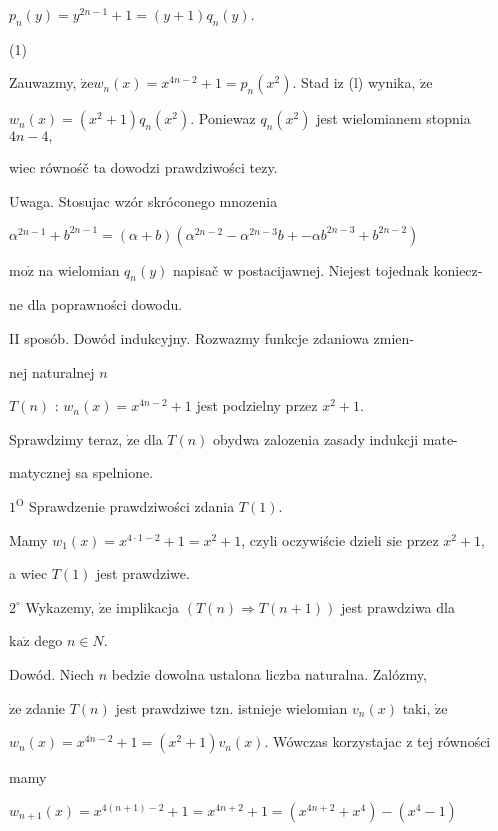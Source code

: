 \documentclass[a4paper,12pt]{article}
\begin{document}
$p_{n}(y)=y^{2n-1}+1=(y+1)q_{n}(y).$

(1)

Zauwazmy, $\dot{\mathrm{z}}\mathrm{e} w_{n}(x) = x^{4n-2}+1 =p_{n}(x^{2})$. Stad $\mathrm{i} \mathrm{z}$ (l) wynika, $\dot{\mathrm{z}}\mathrm{e}$

$w_{n}(x)=(x^{2}+1)q_{n}(x^{2})$. Poniewaz $q_{n}(x^{2})$ jest wielomianem stopnia $4n-4,$

wiec równośč ta dowodzi prawdziwości tezy.

Uwaga. Stosujac wzór skróconego mnozenia

$\alpha^{2n-1}+b^{2n-1}=(\alpha+b)(\alpha^{2n-2}-\alpha^{2n-3}b+-\alpha b^{2n-3}+b^{2n-2})$

$\mathrm{m}\mathrm{o}\dot{\mathrm{z}}$ na wielomian $q_{n}(y)$ napisač $\mathrm{w}$ postacijawnej. Niejest tojednak koniecz-

ne dla poprawności dowodu.

II sposób. Dowód indukcyjny. Rozwazmy funkcje zdaniowa zmien-

nej naturalnej $n$

$T(n)$ : $w_{n}(x)=x^{4n-2}+1$ jest podzielny przez $x^{2}+1.$

Sprawdzimy teraz, $\dot{\mathrm{z}}\mathrm{e}$ dla $T(n)$ obydwa zalozenia zasady indukcji mate-

matycznej sa spelnione.

$1^{\mathrm{O}}$ Sprawdzenie prawdziwości zdania $T(1).$

Mamy $w_{1}(x)=x^{4\cdot 1-2}+1=x^{2}+1$, czyli oczywiście dzieli $\mathrm{s}\mathrm{i}\mathrm{e}$ przez $x^{2}+1,$

a wiec $T(1)$ jest prawdziwe.

$2^{\circ}$ Wykazemy, $\dot{\mathrm{z}}\mathrm{e}$ implikacja $(T(n)\Rightarrow T(n+1))$ jest prawdziwa dla

$\mathrm{k}\mathrm{a}\dot{\mathrm{z}}$ dego $n\in N.$

Dowód. Niech $n$ bedzie dowolna ustalona liczba naturalna. Zalózmy,

$\dot{\mathrm{z}}\mathrm{e}$ zdanie $T(n)$ jest prawdziwe $\mathrm{t}\mathrm{z}\mathrm{n}$. istnieje wielomian $v_{n}(x)$ taki, $\dot{\mathrm{z}}\mathrm{e}$

$w_{n}(x) =x^{4n-2}+1 = (x^{2}+1)v_{n}(x)$. Wówczas korzystajac $\mathrm{z}$ tej równości

mamy

$w_{n+1}(x)=x^{4(n+1)-2}+1=x^{4n+2}+1=(x^{4n+2}+x^{4})-(x^{4}-1)$
\end{document}

